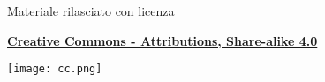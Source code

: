 \documentclass{beamer}
\begin{document}
\begin{frame}

\begin{center}
	\bigskip
	Materiale rilasciato con licenza

	\textbf{\href{http://creativecommons.org/licenses/by-sa/4.0/}{Creative Commons - Attributions, Share-alike 4.0}}

	\medskip
	\texttt{[image: cc.png]}
\end{center}

\end{frame}
\end{document}
